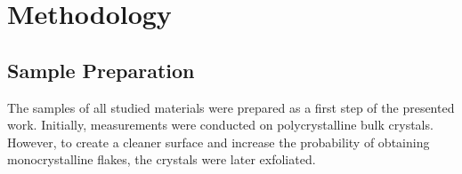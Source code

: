 \documentclass[
	twoside,
	parskip=half,
	a4paper,
]{scrbook}
\begin{document}




\chapter{Methodology}
\section{Sample Preparation}
The samples of all studied materials were prepared as a first step of the presented work.
Initially, measurements were conducted on polycrystalline bulk crystals.
However, to create a cleaner surface and increase the probability of obtaining monocrystalline flakes, the crystals were later exfoliated.
\end{document}
